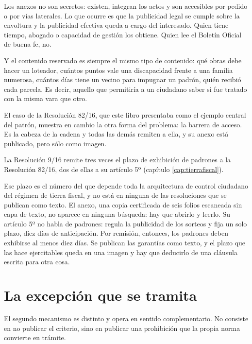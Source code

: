 \begin{cautela}
Los anexos no son secretos: existen, integran los actos y son accesibles por pedido o por vías laterales. Lo que ocurre es que la publicidad legal se cumple sobre la envoltura y la publicidad efectiva queda a cargo del interesado. Quien tiene tiempo, abogado o capacidad de gestión los obtiene. Quien lee el Boletín Oficial de buena fe, no.

Y el contenido reservado es siempre el mismo tipo de contenido: qué obras debe hacer un loteador, cuántos puntos vale una discapacidad frente a una familia numerosa, cuántos días tiene un vecino para impugnar un padrón, quién recibió cada parcela. Es decir, aquello que permitiría a un ciudadano saber si fue tratado con la misma vara que otro.
\end{cautela}

\begin{cautela}
El caso de la Resolución 82/16, que este libro presentaba como el ejemplo central del patrón, muestra en cambio la otra forma del problema: la barrera de acceso. Es la cabeza de la cadena y todas las demás remiten a ella, y su anexo está publicado, pero sólo como imagen.

La Resolución 9/16 remite tres veces el plazo de exhibición de padrones a la Resolución 82/16, dos de ellas a su artículo 5º (capítulo \ref{cap:tierrafiscal}).

Ese plazo es el número del que depende toda la arquitectura de control ciudadano del régimen de tierra fiscal, y no está en ninguna de las resoluciones que se publican como texto. El anexo, una copia certificada de seis folios escaneada sin capa de texto, no aparece en ninguna búsqueda: hay que abrirlo y leerlo. Su artículo 5º no habla de padrones: regula la publicidad de los sorteos y fija un solo plazo, diez días de anticipación. Por remisión, entonces, los padrones deben exhibirse al menos diez días. Se publican las garantías como texto, y el plazo que las hace ejercitables queda en una imagen y hay que deducirlo de una cláusula escrita para otra cosa.
\end{cautela}

\section{La excepción que se tramita}

El segundo mecanismo es distinto y opera en sentido complementario. No consiste en no publicar el criterio, sino en publicar una prohibición que la propia norma convierte en trámite.

